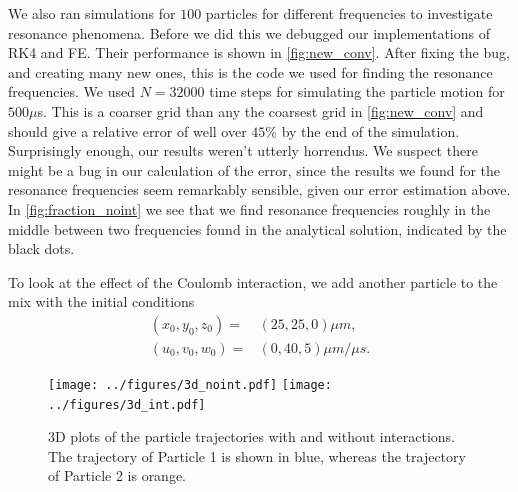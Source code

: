 We also ran simulations for $100$ particles for different frequencies to investigate resonance
phenomena. Before we did this we debugged our implementations of RK4 and FE. Their performance is
shown in \autoref{fig:new_conv}. After fixing the bug, and creating many new ones, this is the code we
used for finding the resonance frequencies. We used $N = 32000$ time steps for simulating the particle
motion for $500 \mu$s. This is a coarser grid than any the coarsest grid in \autoref{fig:new_conv}
and should give a relative error of well over $45\%$ by the end of the simulation.
Surprisingly enough, our results weren't utterly horrendus.
We suspect there might be a bug in our calculation of the
error, since the results we found for the resonance frequencies seem remarkably sensible, given our error estimation above.
In \autoref{fig:fraction_noint} we see that we find resonance frequencies roughly in the middle between
two frequencies found in the analytical solution, indicated by the black dots.


To look at the effect of the Coulomb interaction, we add another particle to the mix with the initial
conditions
\begin{align}
  (x_0, y_0, z_0) =& (25, 25, 0)\mu m, \\
  (u_0, v_0, w_0) =& (0, 40, 5) \mu m / \mu s.
\end{align}

\begin{figure}
\centering
\texttt{[image: ../figures/3d\_noint.pdf]}
\texttt{[image: ../figures/3d\_int.pdf]}
\caption{3D plots of the particle trajectories with and without interactions. The trajectory of Particle 1 is shown in blue, whereas the trajectory of Particle 2 is orange. }
\label{fig:3d}
\end{figure}

